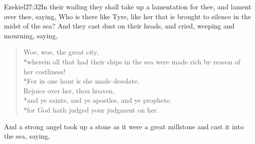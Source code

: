 				  {Ezekiel}{27:32}{In their wailing they shall take up a lamentation for thee, and lament over thee, saying, Who is there like Tyre, like her that is brought to silence in the midst of the sea?} %
And they cast dust on their heads, and cried, weeping and mourning, saying, 
\begin{verse}
Woe, woe, the great city,\\*\vin wherein all that had their ships in the sea were made rich by reason of her costliness!\\*\vin For in one hour is she made desolate.%
	\\
Rejoice over her, thou heaven,\\*\vin and ye saints, and ye apostles, and ye prophets;\\*\vin for God hath judged your judgment on her.%
\end{verse}
And a strong angel took up a stone as it were a great millstone and cast it into the sea, saying,
